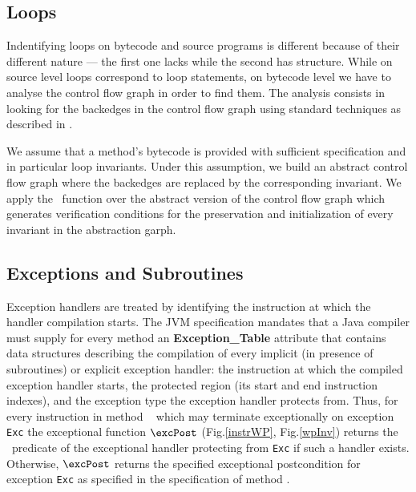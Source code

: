 \subsection{Loops}
Indentifying loops on bytecode and source programs is different because of their different nature --- 
the first one lacks while the second has structure. While on source level loops correspond to loop statements,  
on bytecode level we have to analyse the control flow graph in order to find them.
 The analysis consists in looking for the backedges in the control flow graph using standard techniques as described in \cite{ARUCom1986}. 
  
 We assume that a method's bytecode is provided with sufficient specification and in particular loop invariants.
 Under this assumption, we build an abstract control flow graph where the backedges are replaced by
 the corresponding invariant. We apply the \wpi \ function over the abstract version of the control flow graph which generates verification conditions for the 
preservation and initialization of every invariant in the abstraction garph. 


     
\subsection{Exceptions and Subroutines}

Exception handlers are treated by identifying the instruction at which the handler compilation starts. The JVM specification mandates 
that a Java compiler must supply for every method an \textbf{Exception\_Table} attribute that contains data structures describing the compilation of
 every implicit (in presence of subroutines) or explicit exception handler: the instruction at which the compiled exception handler starts,
 the protected region (its start and end instruction indexes), and the exception type the exception handler protects from. Thus, 
for every instruction  in method \method~ which may terminate exceptionally on exception \texttt{Exc} the exceptional function
 $\excPost$ (Fig.\ref{instrWP}, Fig.\ref{wpInv}) returns the \wpi \ predicate of the exceptional handler protecting  from \texttt{Exc} if such a handler exists.
Otherwise, $\excPost$ returns the specified exceptional postcondition for exception \texttt{Exc} as specified in the specification of
method \method.

